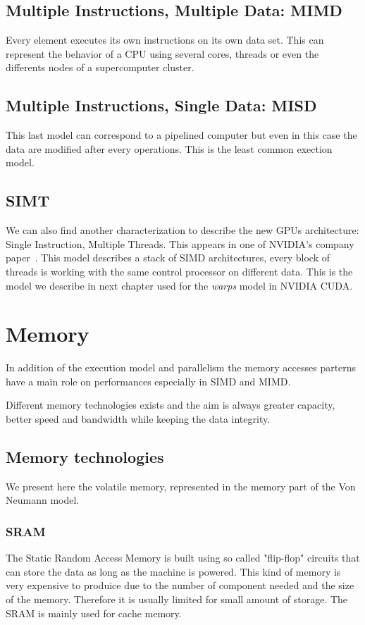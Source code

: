 \subsection{Multiple Instructions, Multiple Data: MIMD}
Every element executes its own instructions on its own data set. 
This can represent the behavior of a CPU using several cores, threads or even the differents nodes of a supercomputer cluster. 

\subsection{Multiple Instructions, Single Data: MISD}
This last model can correspond to a pipelined computer but even in this case the data are modified after every operations.
This is the least common exection model.

\subsection{SIMT}
We can also find another characterization to describe the new GPUs architecture: Single Instruction, Multiple Threads. 
This appears in one of NVIDIA's company paper~\cite{lindholm2008nvidia}. 
This model describes a stack of SIMD architectures, every block of threads is working with the same control processor on different data. 
This is the model we describe in next chapter used for the \textit{warps} model in NVIDIA CUDA.

\section{Memory}
In addition of the execution model and parallelism the memory accesses parterns have a main role on performances especially in SIMD and MIMD. 

Different memory technologies exists and the aim is always greater capacity, better speed and bandwidth while keeping the data integrity.

\subsection{Memory technologies}
We present here the volatile memory, represented in the memory part of the Von Neumann model. 

\subsubsection{SRAM}
The Static Random Access Memory is built using so called "flip-flop" circuits that can store the data as long as the machine is powered. 
This kind of memory is very expensive to produice due to the number of component needed and the size of the memory.
Therefore it is usually limited for small amount of storage. 
The SRAM is mainly used for cache memory. 

